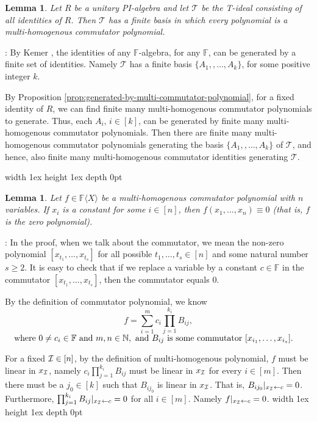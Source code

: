 \documentclass[12pt,reqno]{article}
\newtheorem{lemma}[theorem]{Lemma}
\newcommand\F{\ensuremath{\mathbb F}}
\newcommand\N{\ensuremath{\mathbb N}}
\newcommand{\freea}{\ensuremath{\F\langle X\rangle}}
\newenvironment{proof}{\QuadSpace\par\noindent{\bf Proof}:}{\EndProof\HalfSpace}
\newcommand{\QuadSpace}{\vspace{0.25\baselineskip}}
\newcommand{\HalfSpace}{\vspace{0.5\baselineskip}}
\newcommand{\EndProof}{ \hfill \vrule width 1ex height 1ex depth 0pt }
\newcommand{\iddocomment}[2][]
{\todo[size=\tiny, caption={#2}, #1, linecolor=green!70!white,         backgroundcolor=blue!10!white,bordercolor=white]
{{#2}}}
\newcommand{\nx}[1]{#1_1,\ldots,#1_{n}}
\newcommand\ii{{\cal I}}
\begin{document}
\begin{lemma}\label{lem:special-basis}
  Let $R$ be a  unitary PI-algebra  and let  $\mathcal T$ be the T-ideal consisting of all identities of $R$. Then $\mathcal T$ has a  finite basis in which every polynomial is a multi-homogenous commutator polynomial.
\end{lemma}

\begin{proof}
By Kemer \cite{Kem87}, the identities of any $\F$-algebra, for any \F, \iddocomment{Is it for any field?}  can be generated by a finite set of identities. Namely $\mathcal T$ has a finite basis $\{A_1, ,\ldots,  A_k\}$, for some positive integer $k$.


By Proposition \ref{prop:generated-by-multi-commutator-polynomial}, for a fixed identity of $R$, we can find finite many  multi-homogenous commutator  polynomials to generate.
Thus, each $A_i,\,i\in[k]$, can be generated by finite many  multi-homogenous commutator polynomials. Then there are finite many multi-homogenous commutator polynomials generating the basis $\{A_1, ,\ldots, A_k\}$ of $\mathcal T$, and hence, also finite many multi-homogenous commutator identities generating $\mathcal T$.

\end{proof}


\begin{lemma}\label{lem:collapse}
  Let  $f\in \freea$ be a  multi-homogenous  commutator polynomial with $n$ variables.
 If $x_i$ is a constant for some  $i\in[n]$,  then $f(\nx{x})\equiv 0$ (that is, $f$ is the zero polynomial).
\end{lemma}
\begin{proof} In the proof, when we talk about the commutator, we mean the non-zero polynomial $[x_{t_1},\ldots,x_{t_s}]$ for all possible $t_1,\ldots, t_s\in[n]$ and some natural number $s\geq 2$. It is easy to check that if we replace a variable by  a constant $c\in \F$ in the commutator $[x_{t_1},\ldots,x_{t_s}]$, then the commutator equals $0$.

By the definition of commutator polynomial, we know
$$f=\sum_{i=1}^m c_i\prod_{j=1}^{k_i} B_{ij},$$
$~~~\text{where }0\neq c_i\in \F\hbox{ and }m,n\in \N,\text{ and  $B_{ij}$ is some  commutator $[x_{i_1},\ldots,x_{i_s}]$}. $
\smallskip


For a fixed $\ii\in[n]$, by the  definition of multi-homogenous polynomial, $f$ must be linear in  $x_\ii$, namely $c_i\prod_{j=1}^{k_i}B_{ij}$ must be linear in  $x_\ii$ for every $i\in[m]$. Then there must be a $j_0\in[k]$ such that $B_{ij_0}$ is linear in $x_\ii$. That is, $B_{ij_0}|_{x_\ii\leftarrow c}=0$. Furthermore,  $\prod_{j=1}^{k_i}B_{ij}|_{x_\ii\leftarrow c}=0$ for all $i\in[m]$. Namely
$f|_{x_\ii\leftarrow c}=0$.
\end{proof}
\end{document}
